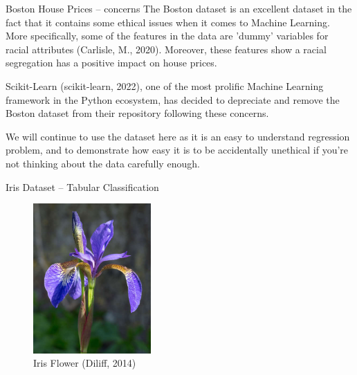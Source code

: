 \documentclass[10pt]{beamer}
\begin{document}
\begin{frame}[label={sec:orgb293e00}]{Boston House Prices -- concerns}
The Boston dataset is an excellent dataset in the fact that it contains some ethical
issues when it comes to Machine Learning. More specifically, some of the features in
the data are 'dummy' variables for racial attributes (Carlisle, M., 2020). Moreover, these features show a
racial segregation has a positive impact on house prices.

Scikit-Learn (scikit-learn, 2022), one of the most prolific Machine Learning framework in the Python
ecosystem, has decided to depreciate and remove the Boston dataset from their
repository following these concerns.

We will continue to use the dataset here as it is an easy to understand regression
problem, and to demonstrate how easy it is to be accidentally unethical if you're not
thinking about the data carefully enough. 
\end{frame}

\begin{frame}[label={sec:orge885fd0}]{Iris Dataset -- Tabular Classification}
\begin{figure}[htbp]
\centering
\includegraphics[width=0.4\textwidth]{images/iris.jpg}
\caption{Iris Flower (Diliff, 2014)}
\end{figure}
\end{frame}
\end{document}
